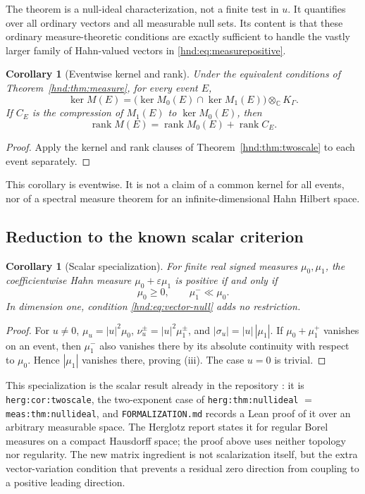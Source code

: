 \documentclass[11pt,oneside]{article}
\newtheorem{corollary}[theorem]{Corollary}
\theoremstyle{definition}
\theoremstyle{remark}
\newcommand{\C}{\mathbb C}
\newcommand{\rank}{\operatorname{rank}}
\newcommand{\eps}{\varepsilon}
\newcommand{\repo}[1]{\nolinkurl{#1}}%
\newcommand{\lbl}[1]{\nolinkurl{#1}}%
\begin{document}
The theorem is a null-ideal characterization, not a finite test in $u$.
It quantifies over all ordinary vectors and all measurable null sets.
Its content is that these ordinary measure-theoretic conditions are
exactly sufficient to handle the vastly larger family of Hahn-valued
vectors in \eqref{hnd:eq:measurepositive}.

\begin{corollary}[Eventwise kernel and rank]\label{hnd:cor:measurekernel}
Under the equivalent conditions of Theorem~\ref{hnd:thm:measure}, for every
event $E$,
\[
 \ker M(E)=\bigl(\ker M_0(E)\cap\ker M_1(E)\bigr)
                  \otimes_\C K_\Gamma.
\]
If $C_E$ is the compression of $M_1(E)$ to $\ker M_0(E)$, then
\[
 \rank M(E)=\rank M_0(E)+\rank C_E.
\]
\end{corollary}
\begin{proof}
Apply the kernel and rank clauses of Theorem~\ref{hnd:thm:twoscale} to
each event separately.
\end{proof}

This corollary is eventwise. It is not a claim of a common kernel for all
events, nor of a spectral measure theorem for an infinite-dimensional
Hahn Hilbert space.

\subsection{Reduction to the known scalar criterion}

\begin{corollary}[Scalar specialization]\label{hnd:cor:scalarmeasure}
For finite real signed measures $\mu_0,\mu_1$, the coefficientwise
Hahn measure $\mu_0+\eps\mu_1$ is positive if and only if
\[
 \mu_0\ge0,\qquad \mu_1^-\ll\mu_0.
\]
In dimension one, condition \eqref{hnd:eq:vector-null} adds no restriction.
\end{corollary}
\begin{proof}
For $u\ne0$, $\mu_u=|u|^2\mu_0$,
$\nu_u^\pm=|u|^2\mu_1^\pm$, and
$|\sigma_u|=|u|\,|\mu_1|$. If $\mu_0+\mu_1^+$ vanishes on an event,
then $\mu_1^-$ also vanishes there by its absolute continuity with
respect to $\mu_0$. Hence $|\mu_1|$ vanishes there, proving (iii).
The case $u=0$ is trivial.
\end{proof}

This specialization is the scalar result already in the repository
\cite{repo-herglotz}: it is \lbl{herg:cor:twoscale}, the two-exponent
case of \lbl{herg:thm:nullideal} $=$ \lbl{meas:thm:nullideal}, and
\repo{FORMALIZATION.md} records a Lean proof of it over an arbitrary
measurable space. The Herglotz report states it for regular Borel
measures on a compact Hausdorff space; the proof above uses neither
topology nor regularity. The new matrix ingredient is not scalarization
itself, but the extra vector-variation condition that prevents a
residual zero direction from coupling to a positive leading direction.
\end{document}
